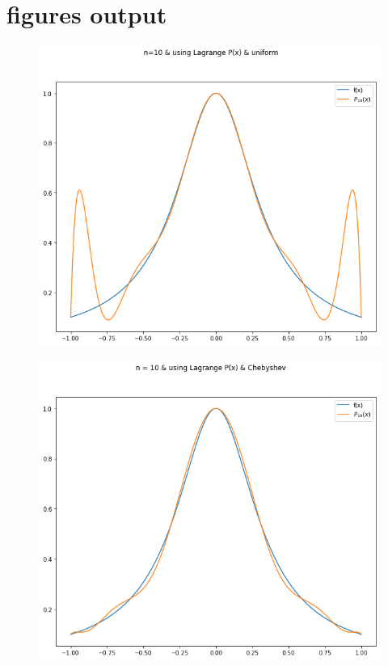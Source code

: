 \documentclass[a4paper]{article}
\begin{document}
\section{figures output}
\begin{figure}[!ht]
\includegraphics[scale=0.5]{10&u.png}
\end{figure}
\begin{figure}[!ht]
\includegraphics[scale=0.5]{10&C.png}
\end{figure}
\end{document}
